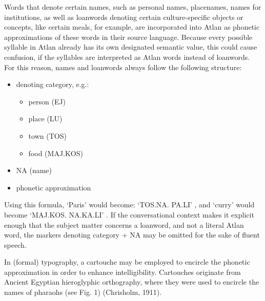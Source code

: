 Words that denote certain names, such as personal names, placenames, names for institutions, as well as loanwords denoting certain culture-specific objects or concepts, like certain meals, for example, are incorporated into Atlan as phonetic approximations of these words in their source language. Because every possible syllable in Atlan already has its own designated semantic value, this could cause confusion, if the syllables are interpreted as Atlan words instead of loanwords. For this reason, names and loanwords always follow the following structure: 

\begin{itemize}
	\item denoting category, e.g.: 
		\begin{itemize}
			\item[] person \ej (EJ)
			\item[] place \lu (LU)
			\item[] town \tos (TOS)
			\item[] food \maj \kos (MAJ.KOS)
		\end{itemize}
	\item NA \na (name)
	\item phonetic approximation  

\end{itemize}

Using this formula, ‘Paris’ would become: ‘TOS.NA. PA.LI’ \cartouche{\tos \na \pa \li}, and ‘curry’ would become ‘MAJ.KOS. NA.KA.LI’ \cartouche{\maj \kos \na \ka \li}. If the conversational context makes it explicit enough that the subject matter concerns a loanword, and not a literal Atlan word, the markers denoting category + NA may be omitted for the sake of fluent speech.  

In (formal) typography, a cartouche may be employed to encircle the phonetic approximation in order to enhance intelligibility. Cartouches originate from Ancient Egyptian hieroglyphic orthography, where they were used to encircle the names of pharaohs (see Fig. 1) (Chrisholm, 1911).  

